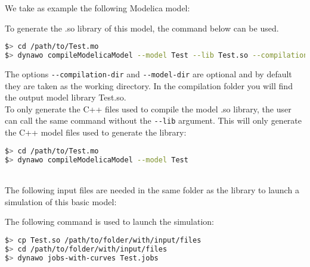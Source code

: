 \documentclass[a4paper, 12pt]{report}
\begin{document}
We take as example the following Modelica model:

To generate the .so library of this model, the command below can be
used. \\

\begin{lstlisting}[language=bash,deletekeywords={jobs,help}]
$> cd /path/to/Test.mo
$> dynawo compileModelicaModel --model Test --lib Test.so --compilation-dir compilation --model-dir .
\end{lstlisting}

The options \lstinline[language=bash]{--compilation-dir} and \lstinline[language=bash]{--model-dir} are optional and by default they are taken as the working directory. In the compilation folder you will find the output model library Test.so. \\

To only generate the C++ files used to compile the model .so library, the user can call the same command without the \lstinline[language=bash]{--lib} argument.
This will only generate the C++ model files used to generate the library:
\begin{lstlisting}[language=bash,deletekeywords={jobs,help}]
$> cd /path/to/Test.mo
$> dynawo compileModelicaModel --model Test
\end{lstlisting}

~~\\
The following input files are needed in the same folder as the library to launch a \Dynawo simulation of this basic model:






The following command is used to launch the simulation:
\begin{lstlisting}[language=bash,deletekeywords={jobs,help}]
$> cp Test.so /path/to/folder/with/input/files
$> cd /path/to/folder/with/input/files
$> dynawo jobs-with-curves Test.jobs
\end{lstlisting}
\end{document}
